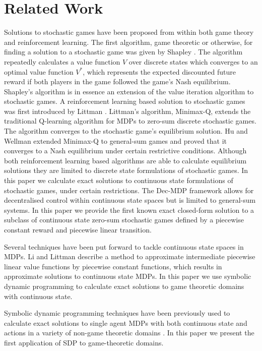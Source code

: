 \section{Related Work}
\label{sec:relatedwork}

Solutions to stochastic games have been proposed from within both
game theory and reinforcement learning. The first algorithm, game theoretic or otherwise, for 
finding a solution to a stochastic game was given by Shapley \cite{Shapley_PotNAoS_1953}.
The algorithm repeatedly calculates a value function $V$ over discrete states
which converges to an optimal value function $V^{*}$, which represents
the expected discounted future reward if both players in the game followed
the game's Nash equilibrium. Shapley's algorithm is in essence an 
extension of the value iteration algorithm to stochastic games. A reinforcement 
learning based solution to stochastic games was first introduced by 
Littman \cite{Littman_ICML_1994}. Littman's algorithm, Minimax-Q,
extends the traditional Q-learning algorithm for MDPs to 
zero-sum discrete stochastic games. The algorithm converges to the 
stochastic game's equilibrium solution. Hu and Wellman \cite{Hu_ICML_1998}
extended Minimax-Q to general-sum games and proved that it converges
to a Nash equilibrium under certain restrictive conditions. Although
both reinforcement learning based algorithms are able to calculate 
equilibrium solutions they are limited to discrete state formulations of
stochastic games. In this paper we calculate exact solutions to 
continuous state formulations of stochastic games, under certain restrictions.
The Dec-MDP \cite{Bernstein_MoOR_2002} framework allows
for decentralised control within continuous state spaces but is limited
to general-sum systems. In this paper we provide the first 
known exact closed-form solution to a subclass of continuous state zero-sum 
stochastic games defined by a piecewise constant reward and piecewise linear transition.

Several techniques have been put forward to tackle continuous state
spaces in MDPs. Li and Littman \cite{Li_AAAI_2005} describe a method
to approximate intermediate piecewise linear value functions by piecewise
constant functions, which results in approximate solutions to continuous
state MDPs. In this paper we use symbolic dynamic programming to
calculate exact solutions to game theoretic domains with continuous state. 

Symbolic dynamic programming techniques have been previously used to calculate
exact solutions to single agent MDPs with both continuous state and actions
in a variety of non-game theoretic domains \cite{Sanner_UAI_2011,Zamani_AAAI_2012}.
In this paper we present the first application of SDP to game-theoretic domains.

